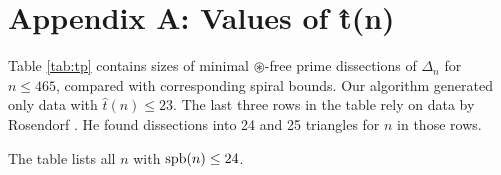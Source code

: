 \setcounter{chapter}{1}
\chapter*{Appendix A: Values of \^ t(n)}
\label{app:values-tn}

Table \ref{tab:tp} contains sizes of minimal $\circledast$-free prime dissections of $\Delta_n$ for $n \leq 465$, compared with corresponding spiral bounds. Our algorithm generated only data with $\hat t(n) \leq 23$. The last three rows in the table rely on data by Rosendorf \cite{Rosendorf04}. He found dissections into 24 and 25 triangles for $n$ in those rows.

The table lists all $n$ with $\mathop{\mathrm{spb}}(n) \leq 24$.

